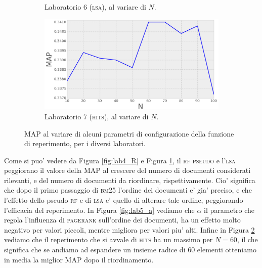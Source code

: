 \begin{figure}
\begin{subfigure}[htpb]{0.475\textwidth}
		\caption[]%
		{{\small Laboratorio 6 (\textsc{lsa}), al variare di $N$.}}    
		\label{fig:lab6_Nd}
	\end{subfigure}
	\quad
	\begin{subfigure}[htpb]{0.475\textwidth}   
		\centering 
		\includegraphics[width=\textwidth]{figures/lab7_N.png}
		\caption[]%
		{{\small Laboratorio 7 (\textsc{hits}), al variare di $N$.}}    
		\label{fig:lab7_Nd}
	\end{subfigure}
        \caption[ The average and standard deviation of claboratorioritical parameters ]
        {\small MAP al variare di alcuni parametri di configurazione della funzione di reperimento, per i diversi laboratori.} 
        \label{fig:map_all}
\end{figure}
Come si puo' vedere da Figura \ref{fig:lab4_R} e Figura \ref{fig:lab6_Nd}, il \textsc{rf pseudo} e l'\textsc{lsa} peggiorano il valore della MAP al crescere del numero di documenti considerati rilevanti, e del numero di documenti da riordinare, rispettivamente. Cio' significa che dopo il primo passaggio di \textsc{bm25} l'ordine dei documenti e' gia' preciso, e che l'effetto dello pseudo \textsc{rf} e di \textsc{lsa} e' quello di alterare tale ordine, peggiorando l'efficacia del reperimento. In Figura \ref{fig:lab5_a} vediamo che $\alpha$ il parametro che regola l'influenza di \textsc{pagerank} sull'ordine dei documenti, ha un effetto molto negativo per valori piccoli, mentre migliora per valori piu' alti. Infine in Figura \ref{fig:lab7_Nd} vediamo che il reperimento che si avvale di \textsc{hits} ha un massimo per $N=60$, il che significa che se andiamo ad espandere un insieme radice di 60 elementi otteniamo in media la miglior MAP dopo il riordinamento.

